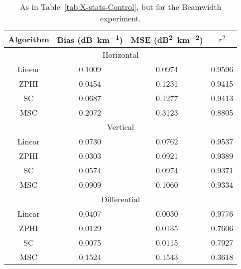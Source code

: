 \begin{table}
    \centering
    \begin{tabular}{| c | c | c | c |}
        \hline
        Algorithm & Bias (\si{dB\per \kilo\meter}) & MSE (\si{dB\squared \per \kilo\meter \squared}) & $r^2$ \\
        \hline
        \hline
        \multicolumn{4}{|c|}{Horizontal}\\
        \hline
        Linear & 0.1009 & 0.0974 & 0.9596\\
        ZPHI & 0.0454 & 0.1231 & 0.9415\\
        SC & 0.0687 & 0.1277 & 0.9413\\
        MSC & 0.2072 & 0.3123 & 0.8805\\
        \hline
        \multicolumn{4}{|c|}{Vertical}\\
        \hline
        Linear & 0.0730 & 0.0762 & 0.9537\\
        ZPHI & 0.0303 & 0.0921 & 0.9389\\
        SC & 0.0574 & 0.0974 & 0.9371\\
        MSC & 0.0909 & 0.1060 & 0.9334\\
        \hline
        \multicolumn{4}{|c|}{Differential}\\
        \hline
        Linear & 0.0407 & 0.0030 & 0.9776\\
        ZPHI & 0.0129 & 0.0135 & 0.7606\\
        SC & 0.0075 & 0.0115 & 0.7927\\
        MSC & 0.1524 & 0.1543 & 0.3618\\
\hline
    \end{tabular}
    \caption{As in Table~\ref{tab:X-stats-Control}, but for
    the Beamwidth experiment.}
    \label{tab:X-stats-Beamwidth}
\end{table}
